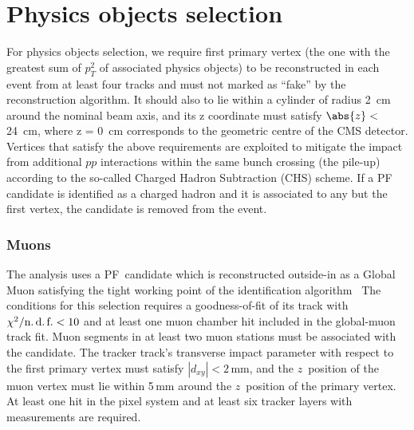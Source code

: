 \section{Physics objects selection}\label{Sec:Reconstruction}
For physics objects selection, we require first primary vertex (the one with the greatest sum of $p_{T}^{2}$ of associated physics objects) to be reconstructed in each event from at least four tracks and must not marked as “fake” by the reconstruction algorithm. It should also to lie within a cylinder of radius 2~cm around the nominal beam axis, and its z coordinate must satisfy $\abs{z} <$ 24~cm, where z = 0~cm corresponds to the geometric centre of the CMS detector.\\
Vertices that satisfy the above requirements are exploited to mitigate the impact from additional $pp$ interactions within the same bunch crossing (the pile-up) according to the so-called Charged Hadron Subtraction (CHS) scheme. If a PF candidate is identified as a charged hadron and it is associated to any but the first vertex, the candidate is removed from the event.

\subsubsection*{Muons}\label{sebsec:muon_selection}
%
The analysis uses a PF~candidate which is reconstructed outside-in as a Global Muon satisfying the tight working point of the identification algorithm~\cite{Wiki:MuonID} 
The conditions for this selection requires a goodness-of-fit of its track with $\chi^2/\text{n.\,d.\,f.} < 10$ and at least one muon chamber hit included in the global-muon track fit.
Muon segments in at least two muon stations must be associated with the candidate.
The tracker track's transverse impact parameter with respect to the first primary vertex must satisfy $|d_{xy}| < 2$\,mm, and the $z$~position of the muon vertex must lie within 5\,mm around the $z$~position of the primary vertex.
At least one hit in the pixel system and at least six tracker layers with measurements are required.

